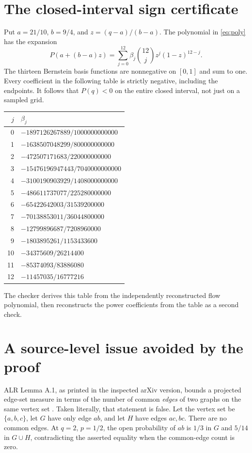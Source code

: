 \documentclass[11pt,a4paper]{article}
\theoremstyle{remark}\newtheorem{remark}[theorem]{Remark}
\begin{document}
\section{The closed-interval sign certificate}\label{app:bernstein}
Put $a=21/10$, $b=9/4$, and $z=(q-a)/(b-a)$. The polynomial in \eqref{eq:poly} has the expansion
\[
P(a+(b-a)z)=\sum_{j=0}^{12}\beta_j\binom{12}{j}z^j(1-z)^{12-j}.
\]
The thirteen Bernstein basis functions are nonnegative on $[0,1]$ and sum to one. Every coefficient in the following table is strictly negative, including the endpoints. It follows that $P(q)<0$ on the entire closed interval, not just on a sampled grid.
\begin{center}
\begin{tabular}{r@{\qquad}l}
\toprule
$j$ & $\beta_j$\\
\midrule
0 & $-1897126267889/1000000000000$\\
1 & $-1638507048299/800000000000$\\
2 & $-472507171683/220000000000$\\
3 & $-15476196947443/7040000000000$\\
4 & $-3100190903929/1408000000000$\\
5 & $-486611737077/225280000000$\\
6 & $-65422642003/31539200000$\\
7 & $-70138853011/36044800000$\\
8 & $-12799896687/7208960000$\\
9 & $-1803895261/1153433600$\\
10 & $-34375609/26214400$\\
11 & $-85374093/83886080$\\
12 & $-11457035/16777216$\\
\bottomrule
\end{tabular}
\end{center}
The checker derives this table from the independently reconstructed flow polynomial, then reconstructs the power coefficients from the table as a second check.

\section{A source-level issue avoided by the proof}\label{app:source}
ALR Lemma A.1, as printed in the inspected arXiv version, bounds a projected edge-set measure in terms of the number of common \emph{edges} of two graphs on the same vertex set \cite[p.~30]{ALR}. Taken literally, that statement is false. Let the vertex set be $\{a,b,c\}$, let $G$ have only edge $ab$, and let $H$ have edges $ac,bc$. There are no common edges. At $q=2$, $p=1/2$, the open probability of $ab$ is $1/3$ in $G$ and $5/14$ in $G\cup H$, contradicting the asserted equality when the common-edge count is zero.
\end{document}
